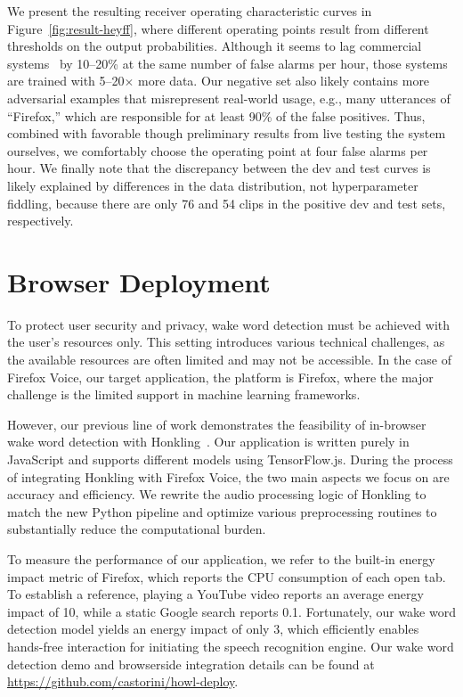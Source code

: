 \documentclass[11pt,a4paper]{article}
\begin{document}
We present the resulting receiver operating characteristic curves in Figure~\ref{fig:result-heyff}, where different operating points result from different thresholds on the output probabilities.
Although it seems to lag commercial systems~\cite{sainath2015convolutional} by 10--20\% at the same number of false alarms per hour, those systems are trained with 5--20$\times$ more data.
Our negative set also likely contains more adversarial examples that misrepresent real-world usage, e.g., many utterances of ``Firefox,'' which are responsible for at least 90\% of the false positives.
Thus, combined with favorable though preliminary results from live testing the system ourselves, we comfortably choose the operating point at four false alarms per hour.
We finally note that the discrepancy between the dev and test curves is likely explained by differences in the data distribution, not hyperparameter fiddling, because there are only 76 and 54 clips in the positive dev and test sets, respectively.


\section{Browser Deployment}

To protect user security and privacy, wake word detection must be achieved with the user's resources only. 
This setting introduces various technical challenges, as the available resources are often limited and may not be accessible.
In the case of Firefox Voice, our target application, the platform is Firefox, where the major challenge is the limited support in machine learning frameworks. 

However, our previous line of work demonstrates the feasibility of in-browser wake word detection with Honkling~\cite{lee2019honkling}.
Our application is written purely in JavaScript and supports different models using TensorFlow.js.
During the process of integrating Honkling with Firefox Voice, the two main aspects we focus on are accuracy and efficiency.
We rewrite the audio processing logic of Honkling to match the new Python pipeline and optimize various preprocessing routines to substantially reduce the computational burden.

To measure the performance of our application, we refer to the built-in energy impact metric of Firefox, which reports the CPU consumption of each open tab.
To establish a reference, playing a YouTube video reports an average energy impact of 10, while a static Google search reports 0.1.
Fortunately, our wake word detection model yields an energy impact of only 3, which efficiently enables hands-free interaction for initiating the speech recognition engine.
Our wake word detection demo and browserside integration details can be found at \url{https://github.com/castorini/howl-deploy}.
\end{document}
